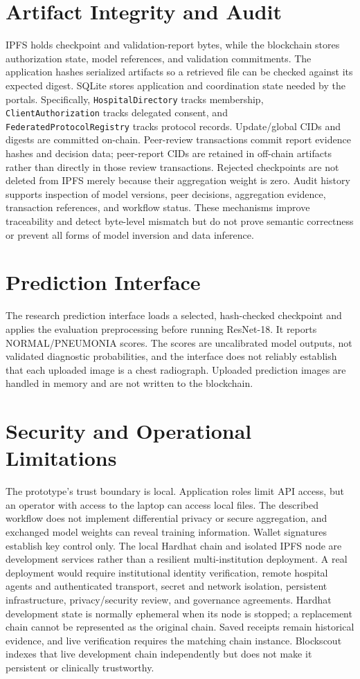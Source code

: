\documentclass[12pt,a4paper]{report}
\begin{document}
\section{Artifact Integrity and Audit}
IPFS holds checkpoint and validation-report bytes, while the blockchain stores authorization state, model references, and validation commitments. The application hashes serialized artifacts so a retrieved file can be checked against its expected digest. SQLite stores application and coordination state needed by the portals. Specifically, \texttt{HospitalDirectory} tracks membership, \texttt{ClientAuthorization} tracks delegated consent, and \texttt{FederatedProtocolRegistry} tracks protocol records. Update/global CIDs and digests are committed on-chain. Peer-review transactions commit report evidence hashes and decision data; peer-report CIDs are retained in off-chain artifacts rather than directly in those review transactions. Rejected checkpoints are not deleted from IPFS merely because their aggregation weight is zero. Audit history supports inspection of model versions, peer decisions, aggregation evidence, transaction references, and workflow status. These mechanisms improve traceability and detect byte-level mismatch but do not prove semantic correctness or prevent all forms of model inversion and data inference.

\section{Prediction Interface}
The research prediction interface loads a selected, hash-checked checkpoint and applies the evaluation preprocessing before running ResNet-18. It reports NORMAL/PNEUMONIA scores. The scores are uncalibrated model outputs, not validated diagnostic probabilities, and the interface does not reliably establish that each uploaded image is a chest radiograph. Uploaded prediction images are handled in memory and are not written to the blockchain.

\section{Security and Operational Limitations}
The prototype's trust boundary is local. Application roles limit API access, but an operator with access to the laptop can access local files. The described workflow does not implement differential privacy or secure aggregation, and exchanged model weights can reveal training information. Wallet signatures establish key control only. The local Hardhat chain and isolated IPFS node are development services rather than a resilient multi-institution deployment. A real deployment would require institutional identity verification, remote hospital agents and authenticated transport, secret and network isolation, persistent infrastructure, privacy/security review, and governance agreements. Hardhat development state is normally ephemeral when its node is stopped; a replacement chain cannot be represented as the original chain. Saved receipts remain historical evidence, and live verification requires the matching chain instance. Blockscout indexes that live development chain independently but does not make it persistent or clinically trustworthy.
\end{document}
